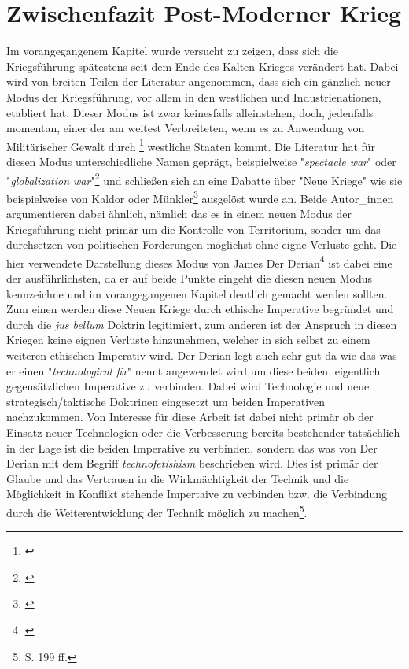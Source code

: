 \documentclass[11pt,a4paper,oneside,numbers=noenddot,bibliography=totocnumbered,DIV=13]{scrartcl}
\begin{document}
\section{Zwischenfazit Post-Moderner Krieg}
Im vorangegangenem Kapitel wurde versucht zu zeigen, dass sich die Kriegsführung spätestens seit dem Ende des Kalten Krieges verändert hat. Dabei wird von breiten Teilen der Literatur angenommen, dass sich ein gänzlich  neuer Modus der Kriegsführung, vor allem in den westlichen und Industrienationen, etabliert hat. Dieser Modus  ist zwar keinesfalls alleinstehen, doch, jedenfalls momentan, einer der am weitest Verbreiteten, wenn es zu Anwendung von Militärischer Gewalt durch \footnote{\cite{duyvesteyn_rethinking_2005}} westliche Staaten kommt. Die Literatur hat für diesen Modus unterschiedliche Namen geprägt, beispielweise "\textit{spectacle war}" oder "\textit{globalization war}"\footnote{\cite{bauman_wars_2001}} und schließen sich an eine Dabatte über "Neue Kriege" wie sie beispielweise von Kaldor oder Münkler\footnote{\cite{munkler_neuen_2004}} ausgelöst wurde an. Beide Autor\_innen argumentieren dabei ähnlich, nämlich das es in einem neuen Modus der Kriegsführung nicht primär um die Kontrolle von Territorium, sonder um das durchsetzen von politischen Forderungen möglichst ohne eigne Verluste geht. Die hier verwendete Darstellung dieses Modus von James Der Derian\footnote{\cite{DerDerian2001}}  ist dabei eine der ausführlichsten, da er auf beide Punkte eingeht die diesen neuen Modus kennzeichne und im vorangegangenen Kapitel deutlich gemacht werden sollten.\\
Zum einen werden diese Neuen Kriege durch ethische Imperative begründet und durch die \textit{jus bellum} Doktrin legitimiert, zum anderen ist der Anspruch in diesen Kriegen keine eignen Verluste hinzunehmen, welcher in sich selbst zu einem weiteren ethischen Imperativ wird. Der Derian legt auch sehr gut da wie das was er einen "\textit{technological fix}" nennt angewendet wird um diese beiden, eigentlich gegensätzlichen Imperative zu verbinden. Dabei wird Technologie und neue strategisch/taktische Doktrinen eingesetzt um beiden Imperativen nachzukommen. Von Interesse für diese Arbeit ist dabei nicht primär ob der Einsatz neuer Technologien oder die Verbesserung bereits bestehender tatsächlich in der Lage ist die beiden Imperative zu verbinden, sondern das was von Der Derian mit dem Begriff \textit{technofetishism} beschrieben wird. Dies ist primär der Glaube und das Vertrauen in die Wirkmächtigkeit der Technik und die Möglichkeit in Konflikt stehende Impertaive zu verbinden bzw. die Verbindung durch die Weiterentwicklung der Technik möglich zu machen\footnote{\cite{DerDerian2001}S. 199 ff.}.      
\newpage
\end{document}
